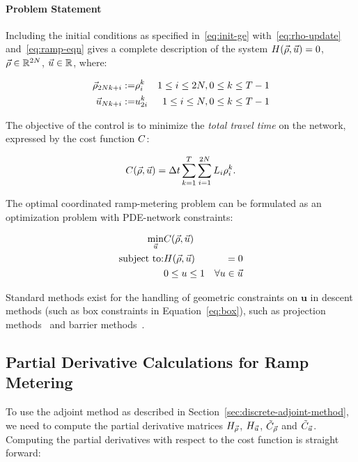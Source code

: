 \paragraph{Problem Statement}

Including the initial conditions as specified in~\eqref{eq:init-ge}
with~\eqref{eq:rho-update} and~\eqref{eq:ramp-eqn} gives
a complete description of the system $\sys\left(\state,\control\right)=0$,
$\vec{\rho}\in\mathbb{R}^{2N}$, $\vec{u}\in\mathbb{R}$, where:

\begin{eqnarray*}
\vec{\rho}_{2Nk+i}:= & \rho_{i}^{k} & 1\le i\le2N,0\le k\le T-1\\
\vec{u}_{Nk+i}:= & u_{2i}^{k} & 1\le i\le N,0\le k\le T-1
\end{eqnarray*}


The objective of the control is to minimize the \emph{total travel
time }on the network, expressed by the cost function $C$:

\[
\cost\left(\state,\control\right)=\Delta t\sum_{k=1}^{T}\sum_{i=1}^{2\nlinks}L_{i}\densitydiscrete{\link}{\tind}.
\]


The optimal coordinated ramp-metering problem can be formulated as
an optimization problem with PDE-network constraints:

\begin{eqnarray}
\min_{\control} & \cost\left(\state,\control\right)\label{eq:full}\\
\text{subject to:} & \sys\left(\state,\control\right) & =0\nonumber \\
& 0\le\convar\le1 & \forall\convar\in\control  \label{eq:box}
\end{eqnarray}

Standard methods exist for the handling of geometric constraints on $\mathbf{u}$ in descent methods (such as box constraints in Equation~\eqref{eq:box}), such as projection methods~\cite{d2010modeling} and barrier methods~\cite{Fiacco1990Nonlinear,Boyd2010b,Bayen2006}.

\subsection{Partial Derivative Calculations for Ramp Metering}
\label{sec:Applications-to-Optimal}

To use the adjoint method as described in Section~\ref{sec:discrete-adjoint-method},
we need to compute the partial derivative matrices $H_{\vec{\rho}}$, $H_{\vec{u}}$,
$\tilde{C}_{\vec{\rho}}$ and $\tilde{C}_{\vec{u}}$. Computing the partial
derivatives with respect to the cost function is straight forward:

